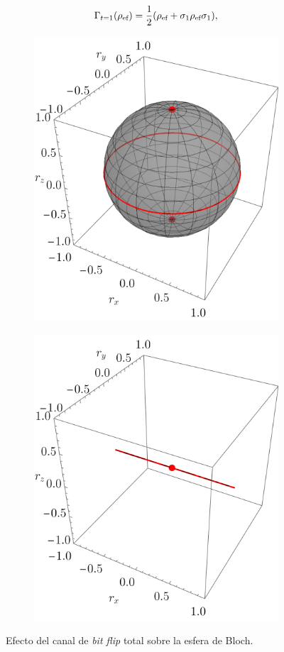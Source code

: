 \begin{equation}
  \Gamma_{t=1}(\rho_{\text{ef}})=\frac{1}{2}\qty(\rho_{\text{ef}}+\sigma_{1}\rho_{\text{ef}}\sigma_{1}),\nonumber
\end{equation}
\begin{figure}[ht!]
  \centering
  \begin{subfigure}{0.5\textwidth}
    \centering
    \includegraphics[width=0.6\linewidth]{chapter4/figures_toy/CNOT_p=0.5_t=0._r=0.9.png}
  \end{subfigure}%
  \begin{subfigure}{0.5\textwidth}
    \centering
    \includegraphics[width=0.6\linewidth]{chapter4/figures_toy/CNOT_p=0._t=1_r=0.9.png}
  \end{subfigure}
  \caption{Efecto del canal de \textit{bit flip} total sobre la esfera de Bloch. \label{fig:BitFlip}}
\end{figure}
